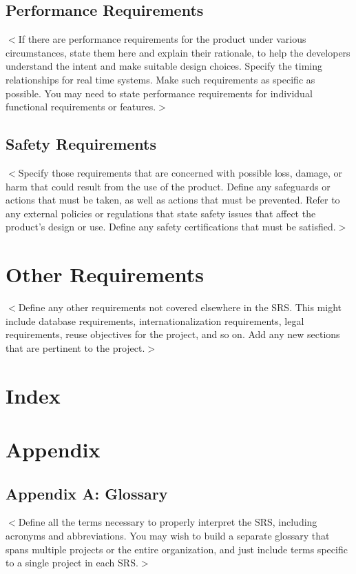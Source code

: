 \documentclass{scrreprt}
\begin{document}
\section{Performance Requirements}
$<$If there are performance requirements for the product under various 
circumstances, state them here and explain their rationale, to help the 
developers understand the intent and make suitable design choices. Specify the 
timing relationships for real time systems. Make such requirements as specific 
as possible. You may need to state performance requirements for individual 
functional requirements or features.$>$
\section{Safety Requirements}
$<$Specify those requirements that are concerned with possible loss, damage, or 
harm that could result from the use of the product. Define any safeguards or 
actions that must be taken, as well as actions that must be prevented. Refer to 
any external policies or regulations that state safety issues that affect the 
product’s design or use. Define any safety certifications that must be 
satisfied.$>$

\chapter{Other Requirements}
$<$Define any other requirements not covered elsewhere in the SRS. This might 
include database requirements, internationalization requirements, legal 
requirements, reuse objectives for the project, and so on. Add any new sections 
that are pertinent to the project.$>$

\chapter{Index}

\chapter{Appendix}

\section{Appendix A: Glossary}
$<$Define all the terms necessary to properly interpret the SRS, including 
acronyms and abbreviations. You may wish to build a separate glossary that spans 
multiple projects or the entire organization, and just include terms specific to 
a single project in each SRS.$>$
\end{document}
